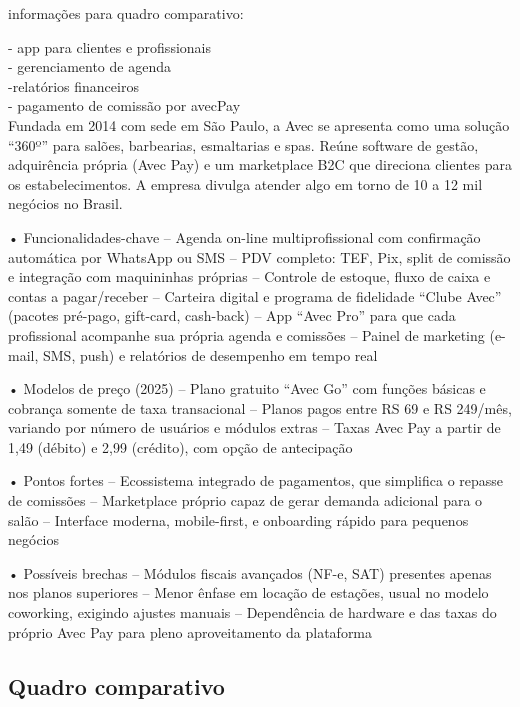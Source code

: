 informações para quadro comparativo:

- app para clientes e profissionais\\
- gerenciamento de agenda\\
-relatórios financeiros\\
- pagamento de comissão por avecPay\\

Fundada em 2014 com sede em São Paulo, a Avec se apresenta como uma solução “360º” para salões, barbearias, esmaltarias e spas. Reúne software de gestão, adquirência própria (Avec Pay) e um marketplace B2C que direciona clientes para os estabelecimentos. A empresa divulga atender algo em torno de 10 a 12 mil negócios no Brasil.

• Funcionalidades-chave
– Agenda on-line multi­profissional com confirmação automática por WhatsApp ou SMS
– PDV completo: TEF, Pix, split de comissão e integração com maquininhas próprias
– Controle de estoque, fluxo de caixa e contas a pagar/receber
– Carteira digital e programa de fidelidade “Clube Avec” (pacotes pré-pago, gift-card, cash-back)
– App “Avec Pro” para que cada profissional acompanhe sua própria agenda e comissões
– Painel de marketing (e-mail, SMS, push) e relatórios de desempenho em tempo real

• Modelos de preço (2025)
– Plano gratuito “Avec Go” com funções básicas e cobrança somente de taxa transacional
– Planos pagos entre RS 69 e RS 249/mês, variando por número de usuários e módulos extras
– Taxas Avec Pay a partir de 1,49 (débito) e 2,99 (crédito), com opção de antecipação

• Pontos fortes
– Ecossistema integrado de pagamentos, que simplifica o repasse de comissões
– Marketplace próprio capaz de gerar demanda adicional para o salão
– Interface moderna, mobile-first, e onboarding rápido para pequenos negócios

• Possíveis brechas
– Módulos fiscais avançados (NF-e, SAT) presentes apenas nos planos superiores
– Menor ênfase em locação de estações, usual no modelo coworking, exigindo ajustes manuais
– Dependência de hardware e das taxas do próprio Avec Pay para pleno aproveitamento da plataforma

\subsection{Quadro comparativo}

